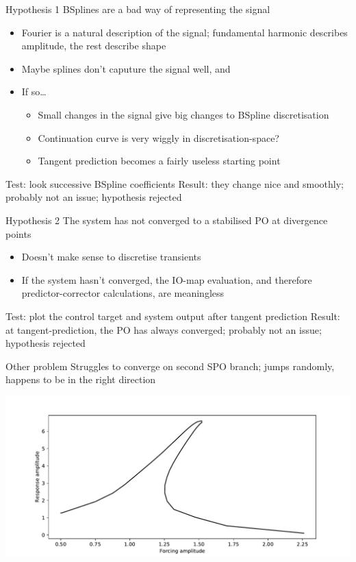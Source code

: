 \documentclass[presentation]{beamer}
\begin{document}
\begin{frame}[label={sec:orgcc6cfba}]{Hypothesis 1}
BSplines are a bad way of representing the signal
\begin{itemize}
\item Fourier is a natural description of the signal; fundamental harmonic describes amplitude, the rest describe shape
\item Maybe splines don't caputure the signal well, and
\item If so\ldots{}
\begin{itemize}
\item Small changes in the signal give big changes to BSpline discretisation
\item Continuation curve is very wiggly in discretisation-space?
\item Tangent prediction becomes a fairly useless starting point
\end{itemize}
\end{itemize}
\vfill
Test: look successive BSpline coefficients
\vfill
Result: they change nice and smoothly; probably not an issue; hypothesis rejected
\end{frame}

\begin{frame}[label={sec:org1cc8e46}]{Hypothesis 2}
The system has not converged to a stabilised PO at divergence points

\begin{itemize}
\item Doesn't make sense to discretise transients
\item If the system hasn't converged, the IO-map evaluation, and therefore predictor-corrector calculations, are meaningless
\end{itemize}
\vfill
Test: plot the control target and system output after tangent prediction
\vfill
Result: at tangent-prediction, the PO has always converged; probably not an issue; hypothesis rejected
\end{frame}
\begin{frame}[label={sec:orge11f5b3}]{Other problem}
Struggles to converge on second SPO branch; jumps randomly, happens to be in the right direction

\begin{center}
\includegraphics[width=.9\linewidth]{./nonadaptive_onestep-newton_dsize5_fdss_none_stepsize1.pdf}
\end{center}
\end{frame}
\end{document}
